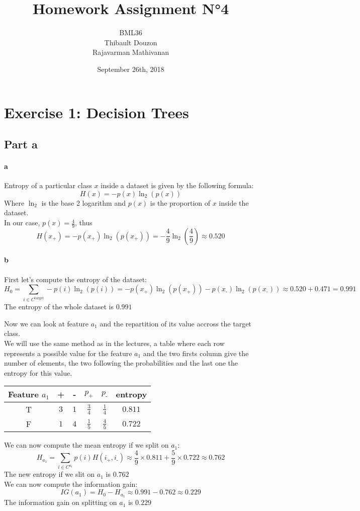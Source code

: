 \documentclass[a4paper, 10pt]{article}
\title{Homework Assignment N°4}
\author{BML36\\Thibault Douzon\\Rajavarman Mathivanan}
\date{September 26th, 2018}
\begin{document}
\maketitle

\pagebreak

\tableofcontents

\pagebreak
\section{Exercise 1: Decision Trees}
\subsection{Part a}
\paragraph{a}
Entropy of a particular class $x$ inside a dataset is given by the following formula:
$$
H(x) = -p(x)\ln_2(p(x))
$$
Where $\ln_2$ is the base 2 logarithm and $p(x)$ is the proportion of $x$ inside the dataset.
\\
In our case, $p(x) = \frac{4}{9}$, thus
$$
H(x_\text{+}) = -p(x_\text{+})\ln_2(p(x_\text{+})) = -\frac{4}{9}\ln_2(\frac{4}{9}) \approx 0.520
$$
\paragraph{b}
First let's compute the entropy of the dataset:
$$
H_0 = \sum_{i \in C^\text{target}} -p(i)\ln_2(p(i)) = -p(x_\text{+})\ln_2(p(x_\text{+})) -p(x_\text{-})\ln_2(p(x_\text{-}))
\approx 0.520 + 0.471 = 0.991
$$
The entropy of the whole dataset is $0.991$

Now we can look at feature $a_1$ and the repartition of its value accross the target class.
\\
We will use the same method as in the lectures, a table where each row represents a possible value
for the feature $a_1$ and the two firsts column give the number of elements, the two following the probabilities 
and the last one the entropy for this value.
\begin{center}
    \begin{tabular}{ |c|c|c|c|c|c| }
        \hline
        Feature $a_1$ & +      & -     & $p_\text{+}$ & $p_\text{-}$ & entropy\\
        \hline 
        T          & $3$    & $1$   & $\frac{3}{4}$ & $\frac{1}{4}$ & $0.811$\\
        \hline
        F          & $1$    & $4$   & $\frac{1}{5}$ & $\frac{4}{5}$ & $0.722$\\
        \hline
    \end{tabular}
\end{center}
We can now compute the mean entropy if we split on $a_1$:
$$
H_{a_1} = \sum_{i \in C^{a_1}} p(i)H(i_\text{+}, i_\text{-}) \approx \frac{4}{9}\times0.811 + \frac{5}{9}\times0.722 \approx 0.762
$$
The new entropy if we slit on $a_1$ is $0.762$
\\
We can now compute the information gain:
$$
IG(a_1) = H_0 - H_{a_1} \approx 0.991 - 0.762 \approx 0.229
$$
The information gain on splitting on $a_1$ is $0.229$
\end{document}
